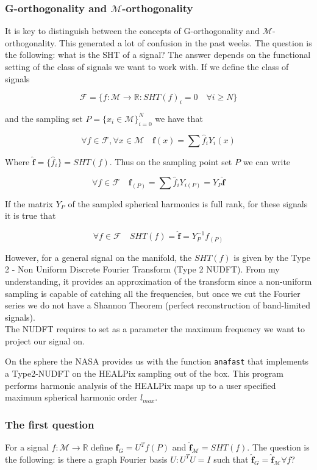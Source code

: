 \subsubsection*{G-orthogonality and $\mathcal M$-orthogonality}
It is key to distinguish between the concepts of G-orthogonality and $\mathcal M$-orthogonality. This generated a lot of confusion in the past weeks. The question is the following: what is the SHT of a signal? The answer depends on the functional setting of the class of signals we want to work with. If we define the class of signals 

$$\mathcal F = \{f: \mathcal M \rightarrow \mathbb R: SHT(f)_i = 0\quad \forall i \geq N \}$$ 

and the sampling set $P = \{x_i \in \mathcal M\}_{i=0}^N$ we have that 

$$\forall f\in \mathcal F,  \forall x\in \mathcal M \quad \mathbf f(x)=\sum \hat f_i Y_i(x)$$

Where $\mathbf {\hat f} = \{\hat f_i\} = SHT(f)$. Thus on the sampling point set $P$ we can write

$$\forall f\in \mathcal F\quad \mathbf f_{(P)}=\sum \hat f_i Y_{i(P)} = Y_P \mathbf {\hat  f}$$


If the matrix $Y_P$ of the sampled spherical harmonics is full rank, for these signals it is true that

$$\forall f \in \mathcal F \quad SHT(f) = \mathbf{\hat f} = Y_P^{-1} f_{(P)}$$

However, for a general signal on the manifold, the $SHT(f)$ is given by the Type 2 - Non Uniform Discrete Fourier Transform (Type 2 NUDFT). From my understanding, it provides an approximation of the transform since a non-uniform sampling is capable of catching all the frequencies, but once we cut the Fourier series we do not have a Shannon Theorem (perfect reconstruction of band-limited signals).\\
The NUDFT requires to set as a parameter the maximum frequency we want to project our signal on.

On the sphere the NASA provides us with the function \lstinline {anafast} that implements a Type2-NUDFT on the HEALPix sampling out of the box. This program performs harmonic analysis of the HEALPix maps up to a user specified maximum spherical harmonic order $l_{max}$.

\subsubsection*{The first question}
For a signal $f: \mathcal M \rightarrow \mathbb R$ define $\mathbf{\hat f}_G = U^T f(P)$ and  $\mathbf{\hat f}_\mathcal M = SHT(f)$.
The question is the following: is there a graph Fourier basis $U: U^TU=I$ such that $\mathbf{\hat f}_G = \mathbf{\hat f}_\mathcal M \forall f$?


